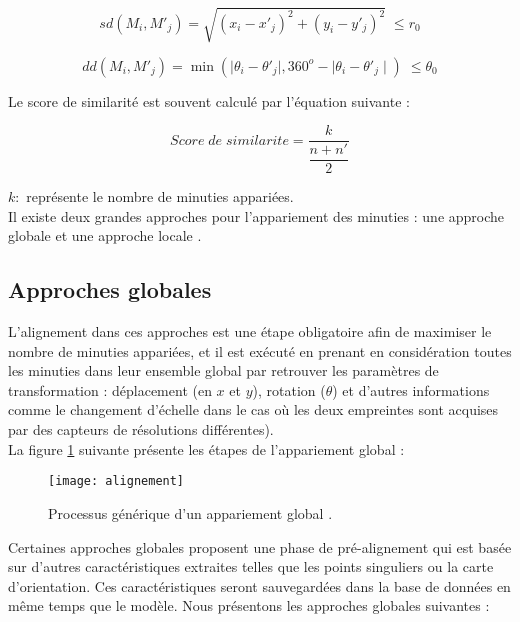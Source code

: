 \begin{center}
	\begin{equation}	
	\label{eq:sd}	
	sd(M_{i},M\prime_{j})=\sqrt{(x_{i}-x\prime _{j})^{2}+(y_{i}-y\prime _{j})^{2}} \; \leq r_{0}
	\end{equation}
\end{center}
\begin{center}
	\begin{equation}\label{eq:dd}	
	dd(M_{i},M'_{j})=\min(\mid\theta_{i}-\theta \prime _{j}\mid, 360^{o} - \mid\theta_{i}-\theta \prime _{j}\mid) \; \leq \theta_{0}
	\end{equation}
\end{center}
Le score de similarité est souvent calculé par l'équation suivante \citep{maltoni2009handbook} :
\begin{center}
	\begin{equation}\label{eq:ss}	
	Score\;de\; similarite=\dfrac{k}{\dfrac{n+n \prime}{2}}
	\end{equation}
\end{center}
\textbf{$ k : $} représente le nombre de minuties appariées.
\\
Il existe deux grandes approches pour l'appariement des minuties  : une approche globale et une approche locale \citep{maltoni2009handbook}.
\subsection{Approches globales }
L'alignement dans ces approches est une étape obligatoire afin de maximiser le nombre de minuties appariées, et il est exécuté en prenant en considération toutes les minuties dans leur ensemble global par retrouver les paramètres de transformation : déplacement (en $ x $ et $ y $), rotation ($ \theta $) et d'autres informations comme le changement d'échelle dans le cas où les deux empreintes sont acquises par des capteurs de résolutions différentes). \\
La figure \ref{fig:alignement} suivante présente les étapes de l'appariement global : 
\begin{center}
	\begin{figure}[H]
		\centering
		 \texttt{[image: alignement]}
		\caption{Processus générique d'un appariement global \citep{Jianjiang2010Finger}.}
		\label{fig:alignement}
	\end{figure}
\end{center}

Certaines approches globales proposent une phase de pré-alignement qui est basée sur d'autres caractéristiques extraites telles que les points singuliers ou la carte d'orientation. Ces caractéristiques seront sauvegardées dans la base de données en même temps que le modèle. 
Nous présentons les approches globales suivantes : 

